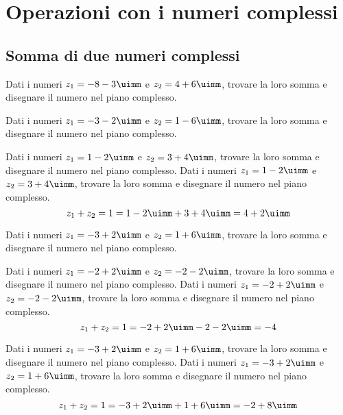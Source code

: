 \tcbstartrecording
\chapter{Operazioni con i numeri complessi}
 \section{Somma di due numeri complessi}
  \begin{exercise}[no solution]
 	Dati i numeri $z_1=-8-3\uimm$ e $z_2=4+6\uimm$, trovare la loro somma e  disegnare il numero nel piano complesso.
 \end{exercise}
 \begin{exercise}[no solution]
	Dati i numeri $z_1=-3-2\uimm$ e $z_2=1-6\uimm$, trovare la loro somma e  disegnare il numero nel piano complesso.
\end{exercise}
 \begin{exercise}
Dati i numeri $z_1=1-2\uimm$ e $z_2=3+4\uimm$, trovare la loro somma e  disegnare il numero nel piano complesso.
\tcblower
Dati i numeri $z_1=1-2\uimm$ e $z_2=3+4\uimm$, trovare la loro somma e  disegnare il numero nel piano complesso.
\[z_1+z_2=1=1-2\uimm+3+4\uimm=4+2\uimm \]
\begin{center}

\label{fig:disegnopianocomplesso07}
\end{center}
 \end{exercise}
 \begin{exercise}[no solution]
Dati i numeri $z_1=-3+2\uimm$ e $z_2=1+6\uimm$, trovare la loro somma e  disegnare il numero nel piano complesso.
 \end{exercise}
 \begin{exercise}
 	Dati i numeri $z_1=-2+2\uimm$ e $z_2=-2-2\uimm$, trovare la loro somma e  disegnare il numero nel piano complesso.
 	\tcblower
 	Dati i numeri $z_1=-2+2\uimm$ e $z_2=-2-2\uimm$, trovare la loro somma e  disegnare il numero nel piano complesso.
 \[z_1+z_2=1=-2+2\uimm-2-2\uimm=-4\]
 	\begin{center}
 		
 		\label{fig:disegnopianocomplesso08}
 	\end{center}
 \end{exercise}
 \begin{exercise}
	Dati i numeri $z_1=-3+2\uimm$ e $z_2=1+6\uimm$, trovare la loro somma e  disegnare il numero nel piano complesso.
	\tcblower
	Dati i numeri $z_1=-3+2\uimm$ e $z_2=1+6\uimm$, trovare la loro somma e  disegnare il numero nel piano complesso.
	\[z_1+z_2=1=-3+2\uimm+1+6\uimm=-2+8\uimm \]
	\begin{center}
		
		\label{fig:disegnopianocomplesso16}
	\end{center}
\end{exercise}
